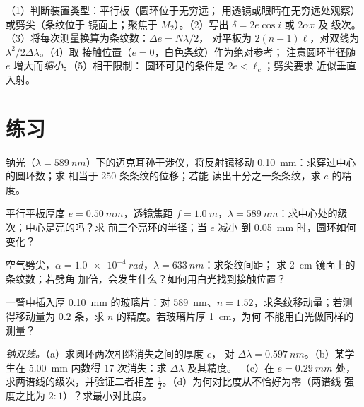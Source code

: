 \begin{method}[使用迈克耳孙干涉仪]\label{met:b2:michelson:method}
（1）判断装置类型：平行板（圆环位于无穷远；
用透镜或眼睛在无穷远处观察）或劈尖（条纹位于
镜面上；聚焦于 $M_2$）。（2）写出 $\delta = 2e\cos i$ 或 $2\alpha x$ 及
级次。（3）将每次测量换算为条纹数：$\Delta e = N\lambda/2$，
对平板为 $2(n - 1)\ell$，对双线为 $\lambda^2/2\Delta\lambda$。（4）取
接触位置（$e = 0$，白色条纹）作为绝对参考；
注意圆环半径随 $e$ 增大而\emph{缩小}。（5）相干限制：
圆环可见的条件是 $2e < \ell_c$；劈尖要求
近似垂直入射。
\end{method}

\section{练习}

\begin{exercise}[$\star$]\label{exo:b2:michelson:1}
钠光（$\lambda = \qty{589}{nm}$）下的迈克耳孙干涉仪，将反射镜移动
\qty{0.10}{mm}：求穿过中心的圆环数；求
相当于 $250$ 条条纹的位移；若能
读出十分之一条条纹，求 $e$ 的精度。
\end{exercise}

\begin{exercise}[$\star$]\label{exo:b2:michelson:2}
平行平板厚度 $e = \qty{0.50}{mm}$，透镜焦距 $f = \qty{1.0}{m}$，$\lambda =
\qty{589}{nm}$：求中心处的级次；中心是亮的吗？求
前三个亮环的半径；当 $e$ 减小
到 \qty{0.05}{mm} 时，圆环如何变化？
\end{exercise}

\begin{exercise}[$\star$]\label{exo:b2:michelson:3}
空气劈尖，$\alpha = \qty{1.0e-4}{rad}$，$\lambda = \qty{633}{nm}$：求条纹间距；
求 \qty{2}{cm} 镜面上的条纹数；若劈角
加倍，会发生什么？如何用白光找到接触位置？
\end{exercise}

\begin{exercise}[$\star$]\label{exo:b2:michelson:4}
一臂中插入厚 \qty{0.10}{mm} 的玻璃片：对
\qty{589}{nm}、$n = 1.52$，求条纹移动量；若测得移动量为 $0.2$ 条，求
$n$ 的精度。若玻璃片厚 \qty{1}{cm}，为何
不能用白光做同样的测量？
\end{exercise}

\begin{exercise}[$\star\star$]\label{exo:b2:michelson:5}
\emph{钠双线。}（a）求圆环两次相继消失之间的厚度 $e$，
对 $\Delta\lambda = \qty{0.597}{nm}$。（b）某学生在
\qty{5.00}{mm} 内数得 $17$ 次消失：求 $\Delta\lambda$ 及其精度。
（c）在 $e = \qty{0.29}{mm}$ 处，求两谱线的级次，并验证二者相差
$\tfrac12$。（d）为何对比度从不恰好为零（两谱线
强度之比为 $2 : 1$）？求最小对比度。
\end{exercise}


